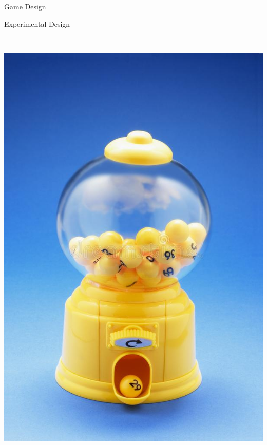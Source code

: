 \documentclass{beamer}
\begin{document}
	\begin{frame}{Game Design}
		
	\end{frame}

	\begin{frame}{Experimental Design}

	\begin{block}

		\begin{columns}[T]
		\begin{column}{0.23\linewidth}
		~\includegraphics[height=0.3\textheight,keepaspectratio]{../imgs/gumball.jpg}
		\end{column}

\end{columns}
\end{block}
\end{frame}
\end{document}
